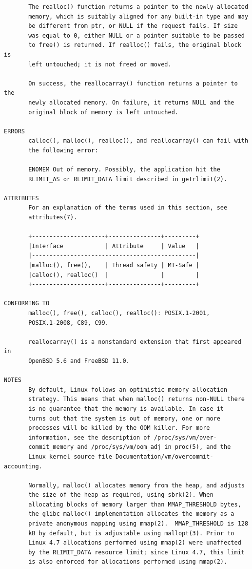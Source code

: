 {\begin{center}
\begin{verbatim}
       The realloc() function returns a pointer to the newly allocated
       memory, which is suitably aligned for any built-in type and may
       be different from ptr, or NULL if the request fails. If size
       was equal to 0, either NULL or a pointer suitable to be passed
       to free() is returned. If realloc() fails, the original block is
       left untouched; it is not freed or moved.

       On success, the reallocarray() function returns a pointer to the
       newly allocated memory. On failure, it returns NULL and the
       original block of memory is left untouched.

ERRORS
       calloc(), malloc(), realloc(), and reallocarray() can fail with
       the following error:

       ENOMEM Out of memory. Possibly, the application hit the
       RLIMIT_AS or RLIMIT_DATA limit described in getrlimit(2).

ATTRIBUTES
       For an explanation of the terms used in this section, see
       attributes(7).

       +---------------------+---------------+---------+
       |Interface            | Attribute     | Value   |
       |-----------------------------------------------|
       |malloc(), free(),    | Thread safety | MT-Safe |
       |calloc(), realloc()  |               |         |
       +---------------------+---------------+---------+

CONFORMING TO
       malloc(), free(), calloc(), realloc(): POSIX.1-2001,
       POSIX.1-2008, C89, C99.

       reallocarray() is a nonstandard extension that first appeared in
       OpenBSD 5.6 and FreeBSD 11.0.

NOTES
       By default, Linux follows an optimistic memory allocation
       strategy. This means that when malloc() returns non-NULL there
       is no guarantee that the memory is available. In case it
       turns out that the system is out of memory, one or more
       processes will be killed by the OOM killer. For more
       information, see the description of /proc/sys/vm/over-    
       commit_memory and /proc/sys/vm/oom_adj in proc(5), and the
       Linux kernel source file Documentation/vm/overcommit-accounting.

       Normally, malloc() allocates memory from the heap, and adjusts
       the size of the heap as required, using sbrk(2). When
       allocating blocks of memory larger than MMAP_THRESHOLD bytes,
       the glibc malloc() implementation allocates the memory as a
       private anonymous mapping using mmap(2).  MMAP_THRESHOLD is 128
       kB by default, but is adjustable using mallopt(3). Prior to
       Linux 4.7 allocations performed using mmap(2) were unaffected
       by the RLIMIT_DATA resource limit; since Linux 4.7, this limit
       is also enforced for allocations performed using mmap(2). 


\end{verbatim}
\end{center}}
